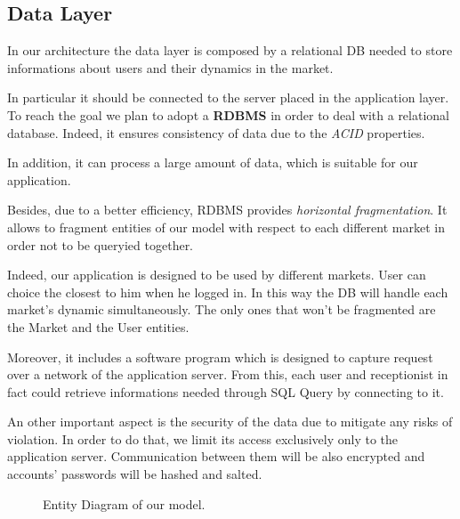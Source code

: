 \subsection{Data Layer}

In our architecture the data layer is composed by a relational DB needed to store informations about users and their dynamics in the market. 

In particular it should be connected to the server placed in the application layer. To reach the goal we plan to adopt a \textbf{RDBMS} in order to deal with a relational database. Indeed, it ensures consistency of data due to the \textit{ACID} properties.

In addition, it can process a large amount of data, which is suitable for our application. 

Besides, due to a better efficiency, RDBMS provides \textit{horizontal fragmentation}. It allows to fragment entities of our model with respect to each different market in order not to be queryied together. 

Indeed, our application is designed to be used by different markets. User can choice the closest to him when he logged in. 
In this way the DB will handle each market's dynamic simultaneously.
The only ones that won't be fragmented are the Market and the User entities.   

Moreover, it includes a software program which is designed to capture request over a network of the application server. From this, each user and receptionist in fact could retrieve informations needed through SQL Query by connecting to it.  


An other important aspect is the security of the data due to mitigate any risks of violation. In order to do that, we limit its access exclusively only to the application server. Communication between them will be also encrypted and accounts' passwords will be hashed and salted.



\begin{figure}[H]
  \centering
    \caption{Entity Diagram of our model.}
      \label{entity_Diagram}
\end{figure} 




